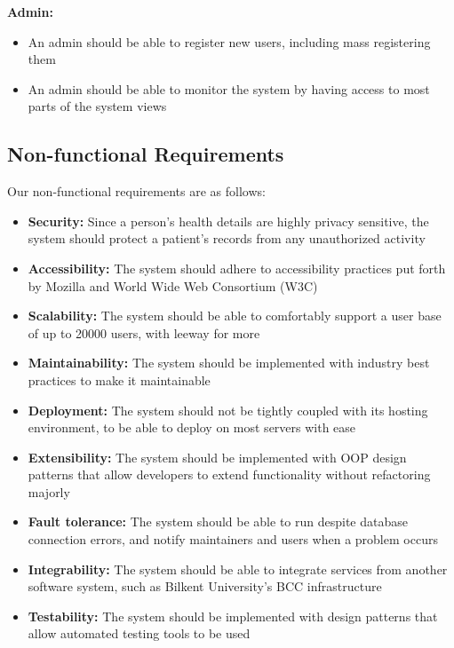 \documentclass[a4paper, 12pt, titlepage]{article}
\begin{document}
  \textbf{Admin:}
  \begin{itemize}
    \item An admin should be able to register new users, including mass registering them
    \item An admin should be able to monitor the system by having access to most parts of the system views
  \end{itemize}

  \pagebreak
  \subsection{Non-functional Requirements}

  Our non-functional requirements are as follows:

  \begin{itemize}
    \item \textbf{Security:} Since a person's health details are highly privacy sensitive, the system should protect a patient's records from any unauthorized activity
    \item \textbf{Accessibility:} The system should adhere to accessibility practices put forth by Mozilla and World Wide Web Consortium (W3C)
    \item \textbf{Scalability:} The system should be able to comfortably support a user base of up to 20000 users, with leeway for more
    \item \textbf{Maintainability:} The system should be implemented with industry best practices to make it maintainable
    \item \textbf{Deployment:} The system should not be tightly coupled with its hosting environment, to be able to deploy on most servers with ease
    \item \textbf{Extensibility:} The system should be implemented with OOP design patterns that allow developers to extend functionality without refactoring majorly
    \item \textbf{Fault tolerance:} The system should be able to run despite database connection errors, and notify maintainers and users when a problem occurs
    \item \textbf{Integrability:} The system should be able to integrate services from another software system, such as Bilkent University's BCC infrastructure
    \item \textbf{Testability:} The system should be implemented with design patterns that allow automated testing tools to be used
  \end{itemize}
\end{document}
